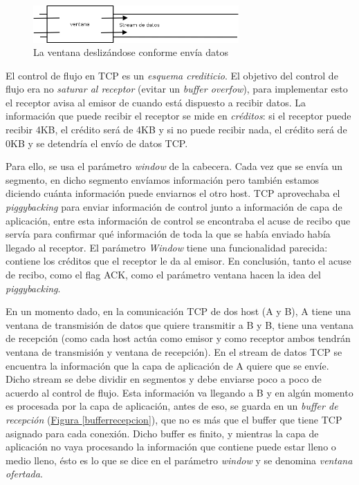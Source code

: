 \documentclass[10pt,a4paper,spanish]{report}
\begin{document}
\begin{figure}[!h]
  \centering
  \includegraphics[width=0.7\textwidth]{ventanadeslizante}
  \caption{La ventana deslizándose conforme envía datos}
  \label{ventanadeslizante}
\end{figure}

El control de flujo en TCP es un \textit{\textcolor{tema3}{esquema crediticio}}. El objetivo del control de flujo era no \textit{\textcolor{tema3}{saturar al receptor}} (evitar un \textit{\textcolor{tema3}{buffer overfow}}), para implementar esto el receptor avisa al emisor de cuando está dispuesto a recibir datos. La información que puede recibir el receptor se mide en \textit{\textcolor{tema3}{créditos}}: si el receptor puede recibir 4KB, el crédito será de 4KB y si no puede recibir nada, el crédito será de 0KB y se detendría el envío de datos TCP.

Para ello, se usa el parámetro \textit{\textcolor{tema3}{window}} de la cabecera. Cada vez que se envía un segmento, en dicho segmento envíamos información pero también estamos diciendo cuánta información puede enviarnos el otro host. TCP aprovechaba el \textit{\textcolor{tema3}{piggybacking}} para enviar información de control junto a información de capa de aplicación, entre esta información de control se encontraba el acuse de recibo que servía para confirmar qué información de toda la que se había enviado había llegado al receptor. El parámetro \textit{\textcolor{tema3}{Window}} tiene una funcionalidad parecida: contiene los créditos que el receptor le da al emisor. En conclusión, tanto el acuse de recibo, como el flag ACK, como el parámetro ventana hacen la idea del \textit{\textcolor{tema3}{piggybacking}}.

En un momento dado, en la comunicación TCP de dos host (A y B), A tiene una ventana de transmisión de datos que quiere transmitir a B y B, tiene una ventana de recepción (como cada host actúa como emisor y como receptor ambos tendrán ventana de transmisión y ventana de recepción). En el stream de datos TCP se encuentra la información que la capa de aplicación de A quiere que se envíe. Dicho stream se debe dividir en segmentos y debe enviarse poco a poco de acuerdo al control de flujo. Esta información va llegando a B y en algún momento es procesada por la capa de aplicación, antes de eso, se guarda en un \textit{\textcolor{tema3}{buffer de recepción}} (\hyperref[bufferrecepcion]{Figura \ref*{bufferrecepcion}}), que no es más que el buffer que tiene TCP asignado para cada conexión. Dicho buffer es finito, y mientras la capa de aplicación no vaya procesando la información que contiene puede estar lleno o medio lleno, ésto es lo que se dice en el parámetro \textit{\textcolor{tema3}{window}} y se denomina \textit{\textcolor{tema3}{ventana ofertada}}.
\end{document}

